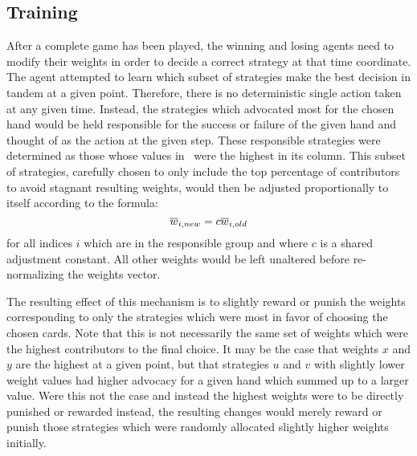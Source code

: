 
\subsection{Training}
\label{sec:dm-methods-training}



After a complete game has been played, the winning and losing agents need to
modify their weights in order to decide a correct strategy at that time
coordinate.
%
The agent attempted to learn which subset of strategies make the best
decision in tandem at a given point.
%
Therefore, there is no deterministic single action taken at any given
time.
%
Instead, the strategies which advocated most for the chosen hand would be held
responsible for the success or failure of the given hand and thought of as
the action at the given step.
%
These responsible strategies were determined as those whose
values in \Smat\ were the highest in its column.
%
This subset of strategies,
carefully chosen to only include the top percentage of contributors
to avoid stagnant resulting weights,
would then be adjusted proportionally to itself according to the formula:
\[
	\overline{w}_{i,new} = c \overline{w}_{i,old}
\]
for all indices $i$ which are in the responsible group and
where $c$ is a shared adjustment constant.
%
All other weights would be left unaltered
before re-normalizing the weights vector.

The resulting effect of this mechanism is to slightly reward or punish the weights
corresponding to only the strategies which were most in favor of choosing
the chosen cards.
%
Note that this is not necessarily the same set of weights which were the highest
contributors to the final choice.
%
It may be the case that weights $x$ and $y$ are the highest at a given point,
but that strategies $u$ and $v$ with slightly lower weight values had higher
advocacy for a given hand which summed up to a larger value.
%
Were this not the case and instead the highest weights were to be directly
punished or rewarded instead,
the resulting changes would merely reward or punish those strategies which
were randomly allocated slightly higher weights initially.

